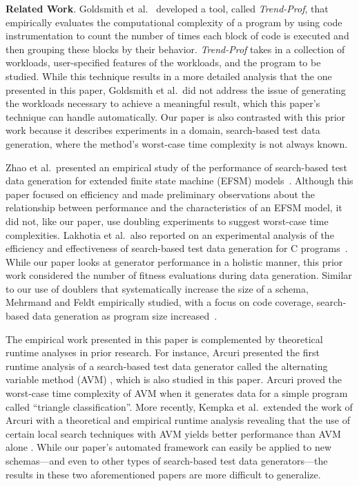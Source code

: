 {\bf Related Work}. Goldsmith et al.~\cite{Goldsmith2007} developed a tool, called \textit{Trend-Prof}, that empirically
evaluates the computational complexity of a program by using code instrumentation to count the number of times each
block of code is executed and then grouping these blocks by their behavior.  \textit{Trend-Prof} takes in a collection
of workloads, user-specified features of the workloads, and the program to be studied. While this technique results in a
more detailed analysis that the one presented in this paper, Goldsmith et al.\ did not address the issue of generating
the workloads necessary to achieve a meaningful result, which this paper's technique can handle automatically.  Our
paper is also contrasted with this prior work because it describes experiments in a domain, search-based test data
generation, where the method's worst-case time complexity is not always known.

Zhao et al.\ presented an empirical study of the performance of search-based test data generation for extended finite
state machine (EFSM) models~\cite{zhao2010}. Although this paper focused on efficiency and made preliminary observations
about the relationship between performance and the characteristics of an EFSM model, it did not, like our paper, use
doubling experiments to suggest worst-case time complexities.  Lakhotia et al.\ also reported on an experimental
analysis of the efficiency and effectiveness of search-based test data generation for C programs~\cite{lakhotia2013}.
While our paper looks at generator performance in a holistic manner, this prior work considered the number of fitness
evaluations during data generation. Similar to our use of doublers that systematically increase the size of a
schema, Mehrmand and Feldt empirically studied, with a focus on code coverage, search-based data generation as program size
increased~\cite{mehrmand2010}.



The empirical work presented in this paper is complemented by theoretical runtime analyses in prior research.  For
instance, Arcuri presented the first runtime analysis of a search-based test data generator called the alternating
variable method (AVM) \cite{arcuri2009}, which is also studied in this paper. Arcuri proved the worst-case time
complexity of AVM when it generates data for a simple program called ``triangle classification''. More recently, Kempka
et al.\ extended the work of Arcuri with a theoretical and empirical runtime analysis revealing that the use of certain
local search techniques with AVM yields better performance than AVM alone \cite{kempka2015}.  While our paper's
automated framework can easily be applied to new schemas---and even to other types of search-based test data
generators---the results in these two aforementioned papers are more difficult to generalize.


